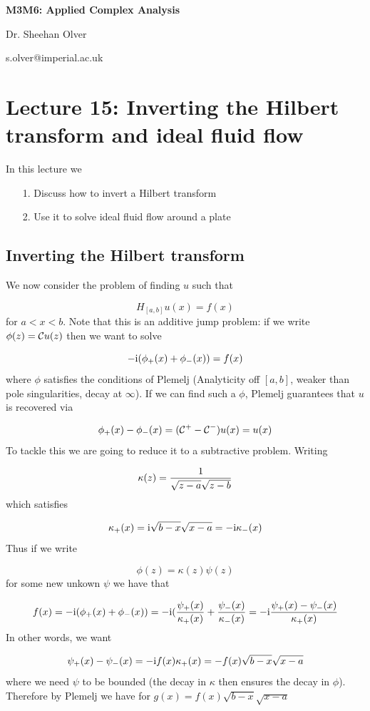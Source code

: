 \documentclass[12pt,a4paper]{article}
\def\I{ {\rm i} }
\def\CC{ {\cal C} }
\begin{document}
\textbf{M3M6: Applied Complex Analysis}

Dr. Sheehan Olver

s.olver@imperial.ac.uk

\section{Lecture 15: Inverting the Hilbert transform and ideal fluid flow}
In this lecture we

\begin{itemize}
\item[1. ] Discuss how to invert a Hilbert transform


\item[2. ] Use it to solve ideal fluid flow around a plate

\end{itemize}
\subsection{Inverting the Hilbert transform}
We now consider the problem of finding $u$ such that

\[
H_{[a,b]} u(x) = f(x)
\]
for $a < x < b$. Note that this is an additive jump problem: if we write $\phi(z) = \CC u(z)$ then we want to solve

\[
-\I (\phi_+(x) + \phi_-(x)) = f(x)
\]
where $\phi$ satisfies the conditions of Plemelj (Analyticity off $[a,b]$, weaker than pole singularities, decay at $\infty$).  If we can find such a $\phi$, Plemelj guarantees that $u$ is recovered via 

\[
\phi_+(x) - \phi_-(x) = (\CC^+ - \CC^-)u(x) = u(x)
\]
To tackle this we are going to reduce it to a subtractive problem. Writing 

\[
\kappa(z) = {1 \over \sqrt{z-a} \sqrt{z-b}}
\]
which satisfies 

\[
\kappa_+(x) = \I \sqrt{b-x} \sqrt{x-a} = - \I \kappa_-(x)
\]
Thus if we write

\[
\phi(z) = \kappa(z) \psi(z)
\]
for some new unkown $\psi$ we have that

\[
f(x) = -\I (\phi_+(x) + \phi_-(x)) = -\I ({\psi_+(x) \over \kappa_+(x)} + {\psi_-(x) \over \kappa_-(x)} = 
-\I {\psi_+(x) - \psi_-(x) \over \kappa_+(x)}
\]
In other words, we want

\[
\psi_+(x) - \psi_-(x) = - \I f(x) \kappa_+(x) = -f(x)\sqrt{b-x}\sqrt{x-a}
\]
where we need $\psi$ to be bounded (the decay in $\kappa$ then ensures the decay in $\phi$).  Therefore by Plemelj we have for $g(x) = f(x) \sqrt{b-x} \sqrt{x-a}$
\end{document}
